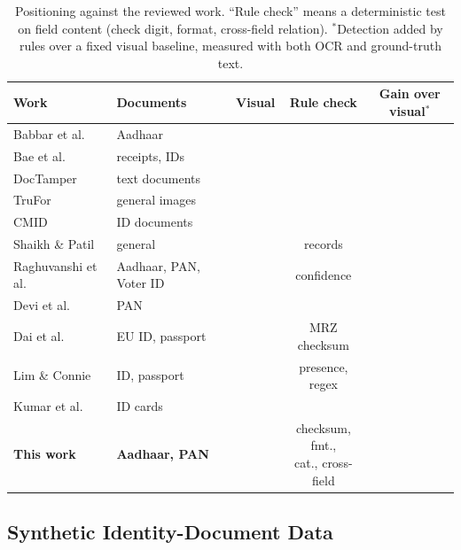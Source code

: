 \documentclass[conference]{IEEEtran}
\newcommand{\cmark}{\textcolor{cfuse}{\ding{51}}}
\newcommand{\xmark}{\textcolor{cbad}{\ding{55}}}
\begin{document}
\begin{table}[!t]
\caption{Positioning against the reviewed work. ``Rule check'' means a
deterministic test on field content (check digit, format, cross-field
relation). $^{\ast}$Detection added by rules over a fixed visual
baseline, measured with both OCR and ground-truth text.}
\label{tab:related}
\centering
\scriptsize
\setlength{\tabcolsep}{2.2pt}
\renewcommand{\arraystretch}{1.12}
\begin{tabular}{@{}l >{\raggedright\arraybackslash}p{1.55cm} c c c@{}}
\toprule
Work & Documents & Visual & Rule check & \makecell{Gain over\\visual$^{\ast}$} \\
\midrule
Babbar et al.~\cite{babbar}       & Aadhaar              & \cmark & \xmark & \xmark \\
Bae et al.~\cite{bae}             & receipts, IDs        & \cmark & \xmark & \xmark \\
DocTamper~\cite{doctamper}        & text documents       & \cmark & \xmark & \xmark \\
TruFor~\cite{trufor}              & general images       & \cmark & \xmark & \xmark \\
CMID~\cite{cmid}                  & ID documents         & \cmark & \xmark & \xmark \\
Shaikh \& Patil~\cite{shaikh}     & general              & \cmark & records & \xmark \\
Raghuvanshi et al.~\cite{raghuvanshi} & Aadhaar, PAN, Voter ID & \xmark & confidence & \xmark \\
Devi et al.~\cite{panens}         & PAN                  & \xmark & \xmark & \xmark \\
Dai et al.~\cite{dai}             & EU ID, passport      & \cmark & MRZ checksum & \xmark \\
Lim \& Connie~\cite{limconnie}    & ID, passport         & \cmark & presence, regex & \xmark \\
Kumar et al.~\cite{flid}          & ID cards             & \cmark & \xmark & \xmark \\
\midrule
\textbf{This work}                & \textbf{Aadhaar, PAN} & \cmark & \makecell[c]{checksum, fmt.,\\cat., cross-field} & \cmark \\
\bottomrule
\end{tabular}
\end{table}

\subsection{Synthetic Identity-Document Data}
\end{document}
